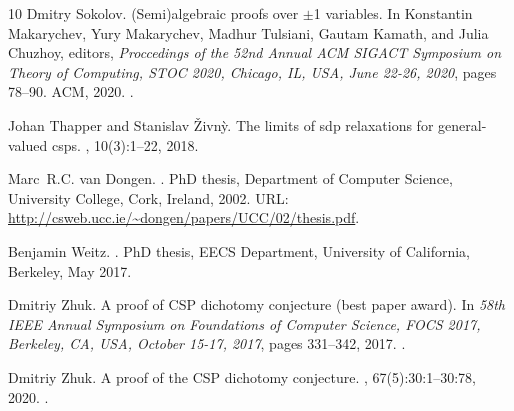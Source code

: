 \documentclass[11pt]{article}
\newcommand{\1}{\textbf{1}}
\begin{document}
\begin{thebibliography}{10}
Dmitry Sokolov.
\newblock ({S}emi)algebraic proofs over {\(\pm\)}1 variables.
\newblock In Konstantin Makarychev, Yury Makarychev, Madhur Tulsiani, Gautam Kamath, and Julia Chuzhoy, editors, {\em Proccedings of the 52nd Annual {ACM} {SIGACT} Symposium on Theory of Computing, {STOC} 2020, Chicago, IL, USA, June 22-26, 2020}, pages 78--90. {ACM}, 2020.
\newblock \href {https://doi.org/10.1145/3357713.3384288} {}.

Johan Thapper and Stanislav {\v{Z}}ivn{\`y}.
\newblock The limits of sdp relaxations for general-valued csps.
, 10(3):1--22, 2018.

Marc~R.C. van Dongen.
.
\newblock PhD thesis, Department of Computer Science, University College, Cork, Ireland, 2002.
\newblock URL: \url{http://csweb.ucc.ie/~dongen/papers/UCC/02/thesis.pdf}.

Benjamin Weitz.
.
\newblock PhD thesis, EECS Department, University of California, Berkeley, May 2017.

Dmitriy Zhuk.
\newblock A proof of {CSP} dichotomy conjecture (best paper award).
\newblock In {\em 58th {IEEE} Annual Symposium on Foundations of Computer Science, {FOCS} 2017, Berkeley, CA, USA, October 15-17, 2017}, pages 331--342, 2017.
\newblock \href {https://doi.org/10.1109/FOCS.2017.38} {}.

Dmitriy Zhuk.
\newblock A proof of the {CSP} dichotomy conjecture.
, 67(5):30:1--30:78, 2020.
\newblock \href {https://doi.org/10.1145/3402029} {}.

\end{thebibliography}
\end{document}
